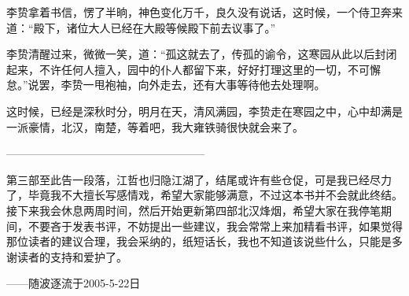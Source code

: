 李贽拿着书信，愣了半晌，神色变化万千，良久没有说话，这时候，一个侍卫奔来道：“殿下，诸位大人已经在大殿等候殿下前去议事了。”

李贽清醒过来，微微一笑，道：“孤这就去了，传孤的谕令，这寒园从此以后封闭起来，不许任何人擅入，园中的仆人都留下来，好好打理这里的一切，不可懈怠。”说罢，李贽一甩袍袖，向外走去，还有大事等待他去处理啊。

这时候，已经是深秋时分，明月在天，清风满园，李贽走在寒园之中，心中却满是一派豪情，北汉，南楚，等着吧，我大雍铁骑很快就会来了。

——————————————————

第三部至此告一段落，江哲也归隐江湖了，结尾或许有些仓促，可是我已经尽力了，毕竟我不大擅长写感情戏，希望大家能够满意，不过这本书并不会就此终结。接下来我会休息两周时间，然后开始更新第四部北汉烽烟，希望大家在我停笔期间，不要吝于发表书评，不妨提出一些建议，我会常常上来加精看书评，如果觉得那位读者的建议合理，我会采纳的，纸短话长，我也不知道该说些什么，只能是多谢读者的支持和爱护了。

——随波逐流于2005-5-22日


